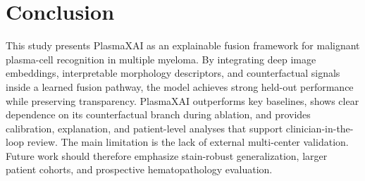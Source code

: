 \documentclass[runningheads]{llncs}
\begin{document}
\section{Conclusion}
This study presents PlasmaXAI as an explainable fusion framework for malignant plasma-cell recognition in multiple myeloma. By integrating deep image embeddings, interpretable morphology descriptors, and counterfactual signals inside a learned fusion pathway, the model achieves strong held-out performance while preserving transparency. PlasmaXAI outperforms key baselines, shows clear dependence on its counterfactual branch during ablation, and provides calibration, explanation, and patient-level analyses that support clinician-in-the-loop review. The main limitation is the lack of external multi-center validation. Future work should therefore emphasize stain-robust generalization, larger patient cohorts, and prospective hematopathology evaluation.
\end{document}
